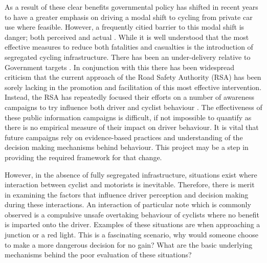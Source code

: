 As a result of these clear benefits governmental policy has shifted in recent years to have a greater emphasis on driving a modal shift to cycling from private car use where feasible. However, a frequently citied barrier to this modal shift is danger; both perceived and actual \citep{lawsonPerceptionSafetyCyclists2013}. While it is well understood that the most effective measures to reduce both fatalities and casualties is the introduction of segregated cycling infrastructure. There has been an under-delivery relative to Government targets \citep{ginty2023YearReview2023}. In conjunction with this there has been widespread criticism that the current approach of the Road Safety Authority (RSA) has been sorely lacking in the promotion and facilitation of this most effective intervention. Instead, the RSA has repeatedly focused their efforts on a number of awareness campaigns to try influence both driver and cyclist behaviour \citep{nugentCyclistsPedestriansAre2015, mcgreevyRoadCyclistsWe2024, rsaCyclistsCampaignRoad2022}. The effectiveness of these public information campaigns is difficult, if not impossible to quantify as there is no empirical measure of their impact on driver behaviour. It is vital that future campaigns rely on evidence-based practices and understanding of the decision making mechanisms behind behaviour. This project may be a step in providing the required framework for that change.

However, in the absence of fully segregated infrastructure, situations exist where interaction between cyclist and motorists is inevitable. Therefore, there is merit in examining the factors that influence driver perception and decision making during these interactions. An interaction of particular note which is commonly observed is a compulsive unsafe overtaking behaviour of cyclists where no benefit is imparted onto the driver. Examples of these situations are when approaching a junction or a red light. This is a fascinating scenario, why would someone choose to make a more dangerous decision for no gain? What are the basic underlying mechanisms behind the poor evaluation of these situations?

